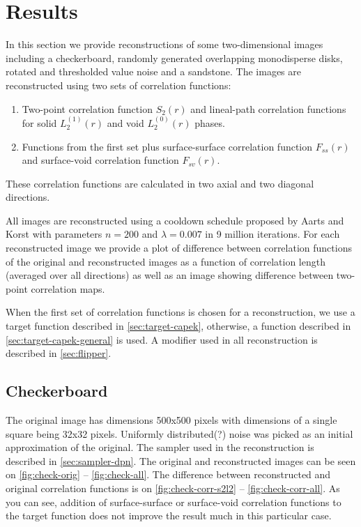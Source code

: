 \documentclass[preprint,amsmath,amssymb,aps,pre]{revtex4-1}
\begin{document}
\section{Results}
In this section we provide reconstructions of some two-dimensional images
including a checkerboard, randomly generated overlapping monodisperse disks,
rotated and thresholded value noise and a sandstone. The images are
reconstructed using two sets of correlation functions:
\begin{enumerate}
\item Two-point correlation function $S_2(r)$ and lineal-path correlation
  functions for solid $L_2^{(1)}(r)$ and void $L_2^{(0)}(r)$ phases.
\item Functions from the first set plus surface-surface correlation function
  $F_{ss}(r)$ and surface-void correlation function $F_{sv}(r)$.
\end{enumerate}
These correlation functions are calculated in two axial and two diagonal
directions.

All images are reconstructed using a cooldown schedule proposed by Aarts and
Korst \cite{Aarts-Korst} with parameters $n = 200$ and $\lambda = 0.007$ in 9
million iterations. For each reconstructed image we provide a plot of difference
between correlation functions of the original and reconstructed images as a
function of correlation length (averaged over all directions) as well as an
image showing difference between two-point correlation maps.

When the first set of correlation functions is chosen for a reconstruction, we
use a target function described in \cref{sec:target-capek}, otherwise, a
function described in \cref{sec:target-capek-general} is used. A modifier used
in all reconstruction is described in \cref{sec:flipper}.

\subsection{Checkerboard}
The original image has dimensions 500x500 pixels with dimensions of a single
square being 32x32 pixels. Uniformly distributed(?) noise was picked as an
initial approximation of the original. The sampler used in the reconstruction is
described in \cref{sec:sampler-dpn}. The original and reconstructed images can
be seen on \cref{fig:check-orig} -- \cref{fig:check-all}. The difference between
reconstructed and original correlation functions is on
\cref{fig:check-corr-s2l2} -- \cref{fig:check-corr-all}. As you can see,
addition of surface-surface or surface-void correlation functions to the target
function does not improve the result much in this particular case.
\end{document}
